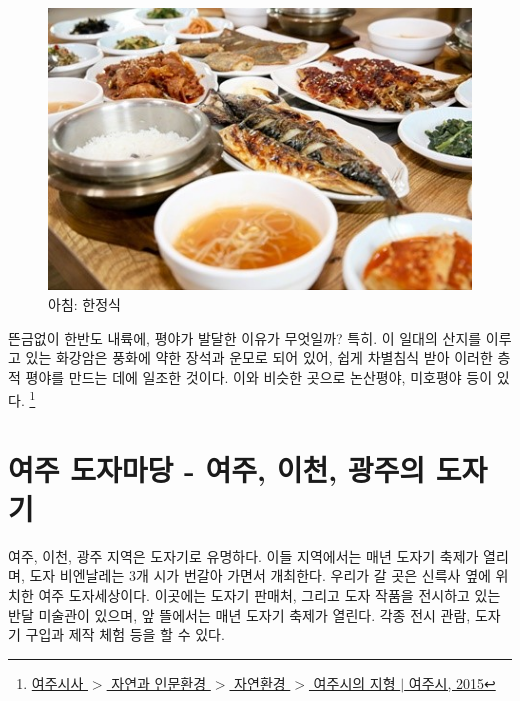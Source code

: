 \begin{figure}
    \centering
    \includegraphics[width=.6\textwidth]{img/한정식.jpg}
    \caption{아침: 한정식 \protect\footnotemark}
    \label{fig:my_labe2}
\end{figure}
뜬금없이 한반도 내륙에, 평야가 발달한 이유가 무엇일까?
특히. 이 일대의 산지를 이루고 있는 화강암은 풍화에 약한 장석과 운모로 되어 있어, 
쉽게 차별침식 받아 이러한 층적 평야를 만드는 데에 일조한 것이다.
이와 비슷한 곳으로 논산평야, 미호평야 등이 있다.
\footnote{ \href{https://www.yeoju.go.kr/history/main.jsp}{여주시사 $>$ 자연과 인문환경 $>$ 자연환경 $>$ 여주시의 지형 $|$ 여주시, 2015}}

\section{여주 도자마당 - 여주, 이천, 광주의 도자기}
여주, 이천, 광주 지역은 도자기로 유명하다. 이들 지역에서는 매년 도자기 축제가 열리며, 도자 비엔날레는 3개 시가 번갈아 가면서 개최한다.
우리가 갈 곳은 신륵사 옆에 위치한 여주 도자세상이다.
 이곳에는 도자기 판매처, 그리고 도자 작품을 전시하고 있는 반달 미술관이 있으며, 앞 뜰에서는 매년 도자기 축제가 열린다. 
 각종 전시 관람, 도자기 구입과 제작 체험 등을 할 수 있다.


